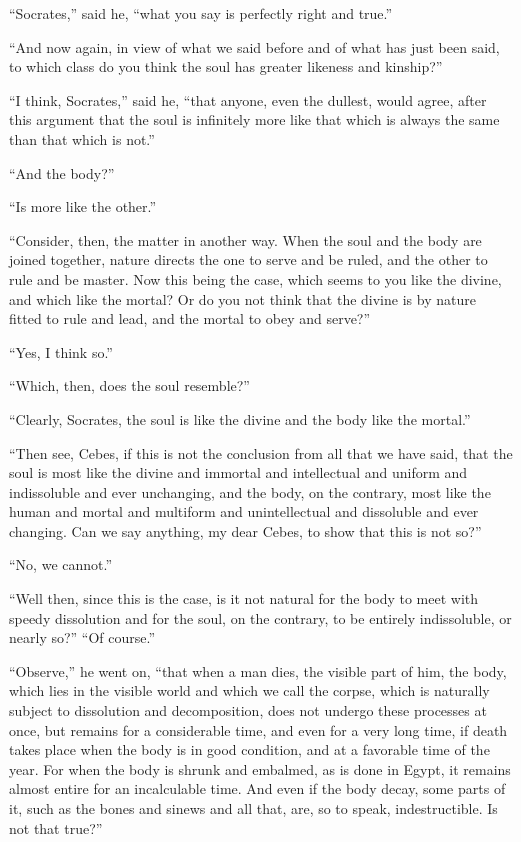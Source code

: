 \documentclass[letterpaper,12pt]{article}
\newcommand{\stephpag}[1]{\marginnote{\small\itshape\fontfamily{ppl}\selectfont #1}}
\begin{document}
\begin{drama}
``Socrates,'' said he, ``what you say is perfectly right and true.''
 
``And now again, in view of what we said before and of what has just been said, to which class do you think \stephpag{e} the soul has greater likeness and kinship?''
 
``I think, Socrates,'' said he, ``that anyone, even the dullest, would agree, after this argument that the soul is infinitely more like that which is always the same than that which is not.''
 
``And the body?''
 
``Is more like the other.''
 
``Consider, then, the matter in another way. When the soul \stephpag{80 a} and the body are joined together, nature directs the one to serve and be ruled, and the other to rule and be master. Now this being the case, which seems to you like the divine, and which like the mortal? Or do you not think that the divine is by nature fitted to rule and lead, and the mortal to obey and serve?''
 
``Yes, I think so.''
 
``Which, then, does the soul resemble?''
 
``Clearly, Socrates, the soul is like the divine and the body like the mortal.''
 
``Then see, Cebes, if this is not the conclusion from all that we have said, \stephpag{b} that the soul is most like the divine and immortal and intellectual and uniform and indissoluble and ever unchanging, and the body, on the contrary, most like the human and mortal and multiform and unintellectual and dissoluble and ever changing. Can we say anything, my dear Cebes, to show that this is not so?''
 
``No, we cannot.''
 
``Well then, since this is the case, is it not natural for the body to meet with speedy dissolution and for the soul, on the contrary, to be entirely indissoluble, or nearly so?'' \stephpag{c} ``Of course.''
 
``Observe,'' he went on, ``that when a man dies, the visible part of him, the body, which lies in the visible world and which we call the corpse, which is naturally subject to dissolution and decomposition, does not undergo these processes at once, but remains for a considerable time, and even for a very long time, if death takes place when the body is in good condition, and at a favorable time of the year. For when the body is shrunk and embalmed, as is done in Egypt, it remains almost entire for an incalculable time. And even if the body decay, \stephpag{d} some parts of it, such as the bones and sinews and all that, are, so to speak, indestructible. Is not that true?''
 

\end{drama}
\end{document}
